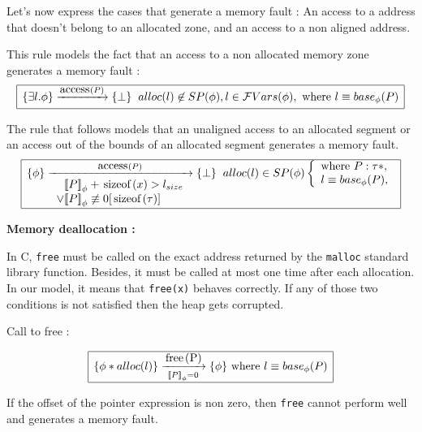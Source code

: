 \documentclass[a4paper,twoside,12pt]{report}
\newcommand{\Sp}[1]{SP(#1)} %
\newcommand{\Alloc}[1]{alloc(#1)}
\newcommand{\Unsep}[0]{\ast}
\newcommand{\Sep}[2]{#1 \Unsep #2}
\newcommand{\FVars}[1]{\mathcal{F}Vars(#1)}
\newcommand{\base}[2]{base_{#1}(#2)}
\newcommand{\lsize}[1]{#1_{size}}
\newcommand{\transmodel}[4]{\lbrace #1 \rbrace \arrow{#2}{#3} \lbrace #4 \rbrace }
\newcommand{\seq}[0]{\equiv} %
\newcommand{\notcongmod}[3]{#1 \not\equiv #2 \lbrack #3 \rbrack}
\newcommand{\interpa}[2]{\sem{#2}_{#1}}
\newcommand{\sizeof}[1]{\mbox{\lstinline!sizeof!}(#1)}
\newcommand{\accs}[1]{\mbox{\lstinline!access!}(#1)}
\begin{document}
Let's now express the cases that generate a memory fault :
An access to a address that doesn't belong to an allocated zone, and
an access to a non aligned address.

This rule models the fact that an access to a non allocated memory zone generates a memory fault :
$$
\begin{array}{|l|}
\hline
\transmodel{\exists l. \phi}{\accs{P}}{}{\bot} \gspace  \Alloc{l}\not \in \Sp{\phi}, l \in \FVars{\phi}, \mbox{ where } l \seq \base{\phi}{P} \\
\hline
\end{array}
$$

The rule that follows models that an unaligned access to an allocated segment
or an access out of the bounds of an allocated segment generates a memory fault.
$$
\begin{array}{|l|}
\hline
\transmodel{\phi}{\accs{P}}{
\begin{array}{l}
\phantom{\vee}  \interpa{\phi}{P}+\sizeof{x} > \lsize{l} \\
\vee \notcongmod{\interpa{\phi}{P}}{0}{\sizeof{\tau}}
\end{array}
}{\bot} \gspace \Alloc{l}\in \Sp{\phi} \left \lbrace  \begin{array}{l} \mbox{where } P:\tau *,\\ l\seq\base{\phi}{P},\\ \end{array} \right . \\
\hline
\end{array}
$$



\textbf{Memory deallocation :}

In C, \lstinline!free! must be called on the exact address returned by the
\lstinline!malloc! standard library function. Besides, it must be called at most one time after each allocation.
In our model, it means that \lstinline!free(x)! behaves correctly. If any of those two conditions is not satisfied then the heap gets corrupted.

Call to free :

$$
\begin{array}{|l|}
\hline
\transmodel{\Sep{\phi}{\Alloc{l}}}{\mbox{\lstinline!free(P)!}}{
\interpa{\phi}{P}=0}{\phi} \mbox{ where } l\seq\base{\phi}{P} \\
\hline
\end{array}
$$

If the offset of the pointer expression is non zero, then \lstinline!free!
cannot perform well and generates a memory fault.
\end{document}
